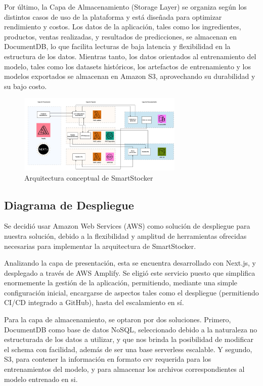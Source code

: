 Por último, la Capa de Almacenamiento (Storage Layer) se organiza según los distintos casos de uso de la plataforma y está diseñada para optimizar rendimiento y costos. Los datos de la aplicación, tales como los ingredientes, productos, ventas realizadas,  y resultados de predicciones, se almacenan en DocumentDB, lo que facilita lecturas de baja latencia y flexibilidad en la estructura de los datos. Mientras tanto, los datos orientados al entrenamiento del modelo, tales como los datasets históricos, los artefactos de entrenamiento y los modelos exportados se almacenan en Amazon S3, aprovechando su durabilidad y su bajo costo.

\begin{figure}[htbp]
    \centering
    \includegraphics[width=0.7\textwidth]{images/arquitectura_capas.png}
    \caption{Arquitectura conceptual de SmartStocker}
    \label{fig:arquitectura-conceptual}
\end{figure}

\subsection{Diagrama de Despliegue}\label{sec:arquitectura-despliegue}
Se decidió usar Amazon Web Services (AWS) como solución de despliegue para nuestra solución, debido a la flexibilidad y amplitud de herramientas ofrecidas necesarias para implementar la arquitectura de SmartStocker.

Analizando la capa de presentación, esta se encuentra desarrollado con Next.js, y desplegado a través de AWS Amplify. Se eligió este servicio puesto que simplifica enormemente la gestión de la aplicación, permitiendo, mediante una simple configuración inicial, encargarse de aspectos tales como el despliegue (permitiendo CI/CD integrado a GitHub), hasta del escalamiento en sí.

Para la capa de almacenamiento, se optaron por dos soluciones. Primero, DocumentDB como base de datos NoSQL, seleccionado debido a la naturaleza no estructurada de los datos a utilizar, y que nos brinda la posibilidad de modificar el schema con facilidad, además de ser una base serverless escalable. Y segundo, S3, para contener la información en formato csv requerida para los entrenamientos del modelo, y para almacenar los archivos correspondientes al modelo entrenado en si.

